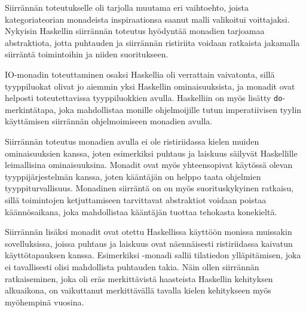 \documentclass[finnish]{tktltiki2}
\begin{document}

Siirrännän toteutukselle oli tarjolla muutama eri vaihtoehto, joista kategoriateorian monadeista
inspiraationsa saanut malli valikoitui voittajaksi. Nykyisin Haskellin siirrännän toteutus hyödyntää
monadien tarjoamaa abstraktiota, jotta puhtauden ja siirrännän ristiriita voidaan ratkaista
jakamalla siirräntä toimintoihin ja niiden suoritukseen.


IO-monadin toteuttaminen osaksi Haskellia oli verrattain vaivatonta, sillä tyyppiluokat olivat jo
aiemmin yksi Haskellin ominaisuuksista, ja monadit ovat helposti toteutettavissa tyyppiluokkien
avulla. Haskelliin on myös lisätty \verb|do|-merkintätapa, joka mahdollistaa monille ohjelmoijille
tutun imperatiivisen tyylin käyttämisen siirrännän ohjelmoimiseen monadien avulla.

Siirrännän toteutus monadien avulla ei ole ristiriidassa kielen muiden ominaisuuksien kanssa, joten
esimerkiksi puhtaus ja laiskuus säilyvät Haskellille leimallisina ominaisuuksina. Monadit ovat myös
yhteensopivat käytössä olevan tyyppijärjestelmän kanssa, joten kääntäjän on helppo taata ohjelmien
tyyppiturvallisuus. Monadinen siirräntä on on myös suorituskykyinen ratkaisu, sillä toimintojen
ketjuttamiseen tarvittavat abstraktiot voidaan poistaa käännösaikana, joka mahdollistaa kääntäjän
tuottaa tehokasta konekieltä.

Siirrännän lisäksi monadit ovat otettu Haskellissa käyttöön monissa muissakin sovelluksissa, joissa
puhtaus ja laiskuus ovat näennäisesti ristiriidassa kaivatun käyttötapauksen kanssa. Esimerkiksi
-monadi sallii tilatiedon ylläpitämisen, joka ei tavallisesti olisi mahdollista
puhtauden takia. Näin ollen siirrännän ratkaiseminen, joka oli eräs merkittävistä haasteista
Haskellin kehityksen alkuaikona, on vaikuttanut merkittävällä tavalla kielen kehitykseen myös
myöhempinä vuosina.



\end{document}
